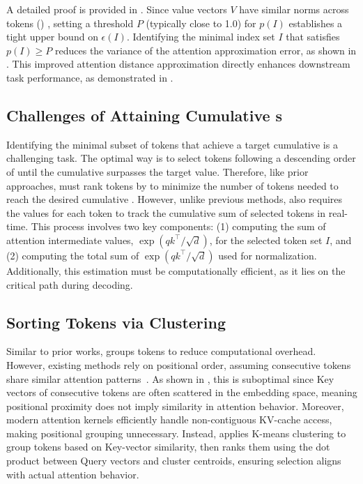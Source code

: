 A detailed proof is provided in . Since value vectors $V$ have similar norms across tokens () , setting a threshold $P$ (typically close to 1.0) for $p(I)$ establishes a tight upper bound on $\epsilon(I)$. Identifying the minimal index set $I$ that satisfies $p(I) \geq P$ reduces the variance of the attention approximation error, as shown in . This improved attention distance approximation directly enhances downstream task performance, as demonstrated in  .  






\subsection{Challenges of Attaining Cumulative \AS{}s}
\label{subsec:analysis-challenge-as}


Identifying the minimal subset of tokens that achieve a target cumulative \as{} is a challenging task. The optimal way is to select tokens following a descending order of \as{} until the cumulative \as{} surpasses the target value. Therefore, like prior approaches, \sys must rank tokens by \as{} to minimize the number of tokens needed to reach the desired cumulative \as{}. However, unlike previous methods, \sys also requires the \as{} values for each token to track the cumulative sum of selected tokens in real-time. This process involves two key components: (1) computing the sum of attention intermediate values, $\exp(qk^\top/\sqrt{d})$, for the selected token set $I$, and (2) computing the total sum of $\exp(qk^\top/\sqrt{d})$ used for normalization. Additionally, this estimation must be computationally efficient, as it lies on the critical path during decoding.  





\subsection{Sorting Tokens via Clustering}
\label{subsec:analysis-clustering}


Similar to prior works, \sys groups tokens to reduce computational overhead. However, existing methods rely on positional order, assuming consecutive tokens share similar attention patterns~\cite{tang2024questqueryawaresparsityefficient}. As shown in , this is suboptimal since Key vectors of consecutive tokens are often scattered in the embedding space, meaning positional proximity does not imply similarity in attention behavior. Moreover, modern attention kernels efficiently handle non-contiguous KV-cache access, making positional grouping unnecessary. Instead, \sys applies K-means clustering to group tokens based on Key-vector similarity, then ranks them using the dot product between Query vectors and cluster centroids, ensuring selection aligns with actual attention behavior.  


